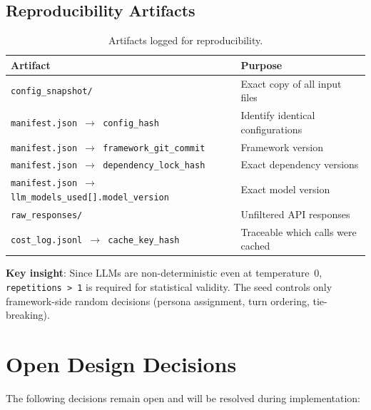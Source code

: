 \documentclass[12pt, a4paper]{article}
\begin{document}
\subsection{Reproducibility Artifacts}

\begin{table}[H]
\centering
\begin{tabularx}{\textwidth}{lX}
    \toprule
    \textbf{Artifact} & \textbf{Purpose} \\
    \midrule
    \texttt{config\_snapshot/} & Exact copy of all input files \\
    \texttt{manifest.json $\to$ config\_hash} & Identify identical configurations \\
    \texttt{manifest.json $\to$ framework\_git\_commit} & Framework version \\
    \texttt{manifest.json $\to$ dependency\_lock\_hash} & Exact dependency versions \\
    \texttt{manifest.json $\to$ llm\_models\_used[].model\_version} & Exact model version \\
    \texttt{raw\_responses/} & Unfiltered API responses \\
    \texttt{cost\_log.jsonl $\to$ cache\_key\_hash} & Traceable which calls were cached \\
    \bottomrule
\end{tabularx}
\caption{Artifacts logged for reproducibility.}
\label{tab:reproducibility}
\end{table}

\textbf{Key insight}: Since LLMs are non-deterministic even at temperature~0, \texttt{repetitions > 1} is required for statistical validity. The seed controls only framework-side random decisions (persona assignment, turn ordering, tie-breaking).

\section{Open Design Decisions}
\label{sec:open}

The following decisions remain open and will be resolved during implementation:
\end{document}
